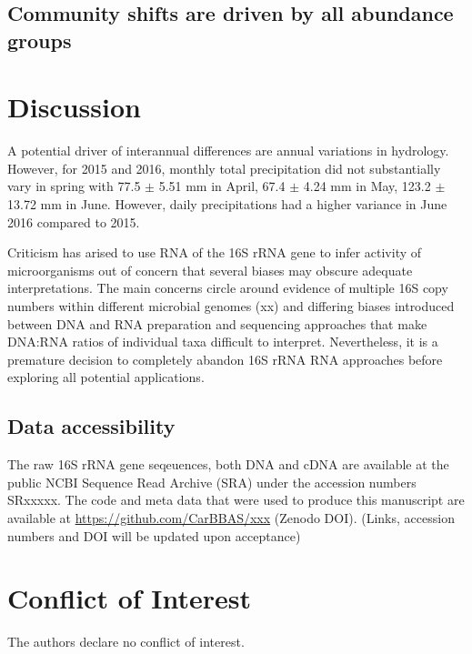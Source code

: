 \documentclass[12pt,a4paper]{article} %
\begin{document}
\subsection*{Community shifts are driven by all abundance groups}


\section*{Discussion}

 A potential driver of interannual differences are annual variations in hydrology. However, for 2015 and 2016, monthly total precipitation did not substantially vary in spring with 77.5 $\pm$ 5.51 mm in April, 67.4 $\pm$ 4.24 mm in May, 123.2 $\pm$ 13.72 mm in June. However, daily precipitations had a higher variance in June 2016 compared to 2015.

 Criticism has arised to use RNA of the 16S rRNA gene to infer activity of microorganisms out of concern that several biases may obscure adequate interpretations. The main concerns circle around evidence of multiple 16S copy numbers within different microbial genomes (xx) and differing biases introduced between DNA and RNA preparation and sequencing approaches that make DNA:RNA ratios of individual taxa difficult to interpret. Nevertheless, it is a premature decision to completely abandon 16S rRNA RNA approaches before exploring all potential applications.

\subsection*{Data accessibility}
The raw 16S rRNA gene seqeuences, both DNA and cDNA are available at the public NCBI Sequence Read Archive (SRA) under the accession numbers SRxxxxx. The code and meta data that were used to produce this manuscript are available at \url{https://github.com/CarBBAS/xxx} (Zenodo DOI). (Links, accession numbers and DOI will be updated upon acceptance) \\

\section*{Conflict of Interest}
The authors declare no conflict of interest.
\end{document}
